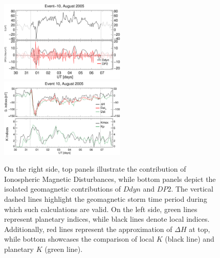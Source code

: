 \documentclass[a4paper,fleqn]{cas-dc}
\begin{document}
\begin{figure}[h!]
       \centerline{\Large \bf   
      \hspace{0.275\textwidth}  \color{black}{}
       \hspace{0.295\textwidth}  \color{black}{}
         \hfill}
	\includegraphics[width=6.0cm]{images/diono/iono_PI_V1_2005-08-30.eps}
	\includegraphics[width=6.0cm]{images/dH_approx/diono_valid_V4_2005-08-30.eps}	
       
       \caption{On the right side, top panels illustrate the contribution of Ionospheric Magnetic Disturbances, while bottom panels depict the isolated geomagnetic contributions of $Ddyn$ and $DP2$. The vertical dashed lines highlight the geomagnetic storm time period during which such calculations are valid. On the left side, green lines represent planetary indices, while black lines denote local indices. Additionally, red lines represent the approximation of $\Delta H$ at top, while bottom showcases the comparison of local $K$ (black line) and planetary $K$ (green line).
       }
    \label{fig:iono_resp3}
\end{figure}
\end{document}
